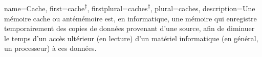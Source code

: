 {
	name=Cache,
	first=cache\textsuperscript{$\ddagger$}, %
	firstplural=caches\textsuperscript{$\ddagger$},
	plural=caches,
	description={Une mémoire cache ou antémémoire est, en informatique, une mémoire qui enregistre temporairement des copies de données provenant d'une source, afin de diminuer le temps d'un accès ultérieur (en lecture) d'un matériel informatique (en général, un processeur) à ces données. \cite{wikipedia-cache}}%
}